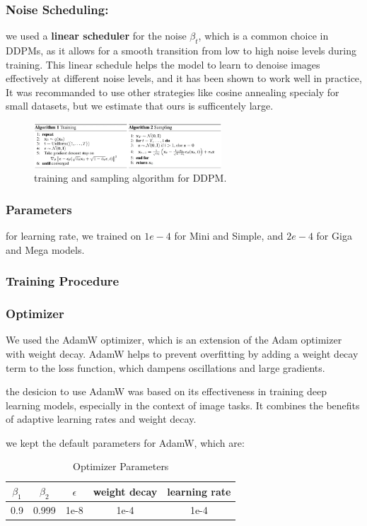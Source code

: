 \documentclass[twocolumn,superscriptaddress,aps]{revtex4-1}
\begin{document}
\subsubsection{Noise Scheduling:}
we used a \textbf{linear scheduler} for the noise $\beta_t$, which is a common choice in DDPMs, as it allows for a smooth transition from low to high noise levels during training. This linear schedule helps the model to learn to denoise images effectively at different noise levels, and it has been shown to work well in practice, It was recommanded to use other strategies like cosine annealing specialy for small datasets, but we estimate that ours is sufficentely large.

\begin{figure}[H]
	\centering
	\includegraphics[width=7cm]{figures/training-sampling-algo-ddpm.png}
	\caption{training and sampling algorithm for DDPM.}
	\label{fig:train-sampling-algo-ddpm}
\end{figure}

\subsubsection{Parameters}
for learning rate, we trained on $1e-4$ for Mini and Simple, and $2e-4$ for Giga and Mega models.

\subsubsection{Training Procedure}

\subsubsection{Optimizer}
We used the AdamW optimizer, which is an extension of the Adam optimizer with weight decay. AdamW helps to prevent overfitting by adding a weight decay term to the loss function, which dampens oscillations and large gradients.

the desicion to use AdamW was based on its effectiveness in training deep learning models, especially in the context of image tasks. It combines the benefits of adaptive learning rates and weight decay.

we kept the default parameters for AdamW, which are:
\begin{table}[ht]
	\centering
	\begin{tabular}{|c|c|c|c|c|}
		\hline
		$\beta_1$ & $\beta_2$ & $\epsilon$ & weight decay & learning rate \\
		\hline
		0.9       & 0.999     & 1e-8       & 1e-4         & 1e-4          \\
		\hline
	\end{tabular}
	\caption{Optimizer Parameters}
	\label{tab:optimizer_params}
\end{table}
\end{document}
